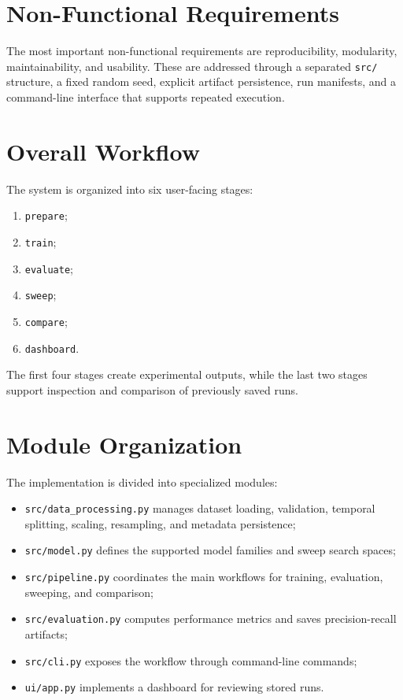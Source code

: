 \documentclass[12pt,a4paper]{report}
\begin{document}
\section{Non-Functional Requirements}
The most important non-functional requirements are reproducibility, modularity, maintainability, and usability. These are addressed through a separated \texttt{src/} structure, a fixed random seed, explicit artifact persistence, run manifests, and a command-line interface that supports repeated execution.

\section{Overall Workflow}
The system is organized into six user-facing stages:
\begin{enumerate}
    \item \texttt{prepare};
    \item \texttt{train};
    \item \texttt{evaluate};
    \item \texttt{sweep};
    \item \texttt{compare};
    \item \texttt{dashboard}.
\end{enumerate}

The first four stages create experimental outputs, while the last two stages support inspection and comparison of previously saved runs.

\section{Module Organization}
The implementation is divided into specialized modules:
\begin{itemize}
    \item \texttt{src/data\_processing.py} manages dataset loading, validation, temporal splitting, scaling, resampling, and metadata persistence;
    \item \texttt{src/model.py} defines the supported model families and sweep search spaces;
    \item \texttt{src/pipeline.py} coordinates the main workflows for training, evaluation, sweeping, and comparison;
    \item \texttt{src/evaluation.py} computes performance metrics and saves precision-recall artifacts;
    \item \texttt{src/cli.py} exposes the workflow through command-line commands;
    \item \texttt{ui/app.py} implements a dashboard for reviewing stored runs.
\end{itemize}
\end{document}
